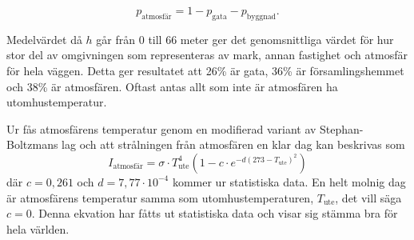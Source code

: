 \begin{equation}
p_\text{atmosfär}=1-p_\text{gata}-p_\text{byggnad}.
\end{equation}

Medelvärdet då $h$ går från 0 till 66 meter ger det genomsnittliga värdet för hur stor del av omgivningen som representeras av mark, annan fastighet och atmosfär för hela väggen. Detta ger resultatet att 26\% är gata, 36\% är 
 församlingshemmet och 38\% är atmosfären. Oftast antas allt som inte är atmosfären ha utomhustemperatur.

Ur \cite{bb_atmosphere} fås atmosfärens temperatur genom en modifierad variant av Stephan-Boltzmans lag och att strålningen från atmosfären en klar dag kan beskrivas som 
\begin{equation}
I_\text{atmosfär}=\sigma\cdot T_\text{ute}^4(1-c \cdot e^{-d(273-T_\text{ute})^2})
\end{equation}
där $c=0,261$ och $d=7,77\cdot10^{-4}$ kommer ur statistiska data. En helt molnig dag är atmosfärens temperatur samma som utomhustemperaturen, $T_\text{ute}$, det vill säga $c=0$. Denna ekvation har fåtts ut statistiska data och visar sig stämma bra för hela världen\cite{bb_atmosphere}.